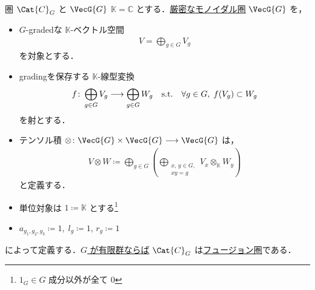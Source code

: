 \documentclass[TQFT_main]{subfiles}
\begin{document}
\begin{myexample}[label=def:CG]{圏 $\Cat{C}_G$ と $\VecG{G}$}
    $\mathbb{K} = \mathbb{C}$ とする．\hyperref[redef:monoidal-category]{厳密なモノイダル圏} $\VecG{G}$ を，
    \begin{itemize}
        \item $G$-gradedな $\mathbb{K}$-ベクトル空間
        \begin{align}
            V = \bigoplus_{g \in G} V_g
        \end{align}
        を対象とする．
        \item gradingを保存する $\mathbb{K}$-線型変換
        \begin{align}
            f \colon \bigoplus_{g \in G} V_g \longrightarrow \bigoplus_{g \in G} W_g \quad \mathrm{s.t.} \quad \forall g \in G,\; f (V_g) \subset W_g
        \end{align}
        を射とする．
        \item テンソル積 $\otimes \colon \VecG{G} \times \VecG{G} \lto \VecG{G}$ は，
        \begin{align}
            V \otimes W \coloneqq \bigoplus_{g \in G} \left( \bigoplus_{\substack{x,\, y \in G, \\ xy = g}} V_x \otimes_{\mathbb{K}} W_y\right)
        \end{align}
        と定義する．
        \item 単位対象は $1 \coloneqq \mathbb{K}$ とする\footnote{$1_G \in G$ 成分以外が全て $0$}
        \item $a_{g_1,g_2,g_3} \coloneqq 1,\; l_{g} \coloneqq 1,\, r_g \coloneqq 1$
    \end{itemize}
    によって定義する．\underline{$G$ が有限群ならば} $\Cat{C}_G$ は\hyperref[def:tensorfusion-cat]{フュージョン圏}である．
\end{myexample}
\end{document}
